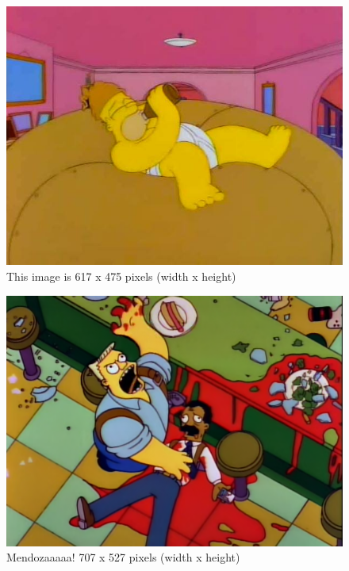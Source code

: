 \documentclass[utf8]{FrontiersinVancouver}   %
\begin{document}
\begin{figure}[htbp]
        \begin{center}
        \includegraphics[width=\linewidth]{homer_giant_donut.jpg}
        \end{center}
    \caption{ This image is 617 x 475 pixels (width x height) }\label{fig:homer_giant_donut}
\end{figure}


\begin{figure}[htbp]
        \begin{center}
        \includegraphics[width=\linewidth]{mendoza.png}
        \end{center}
    \caption{ Mendozaaaaa! 707 x 527 pixels (width x height) }\label{fig:mendoza}
\end{figure}
\end{document}
